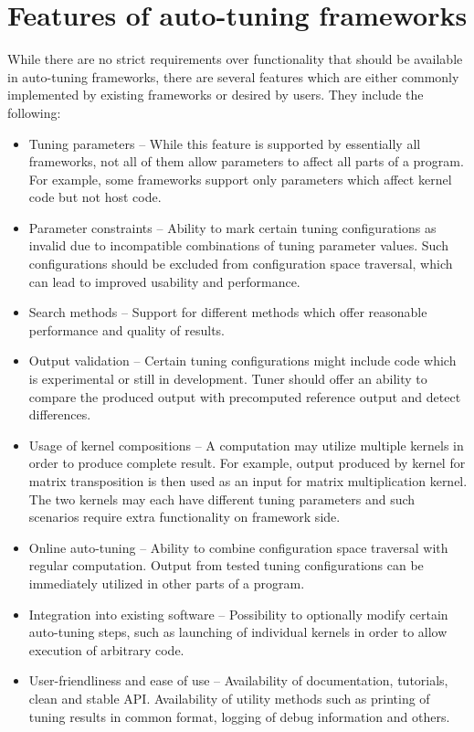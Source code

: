 \documentclass
[
    digital, %
    oneside, %
    table, %
    nolof, %
    nolot, %
    nocover %
]{fithesis3}
\begin{document}
\section{Features of auto-tuning frameworks}
While there are no strict requirements over functionality that should be available in auto-tuning frameworks, there are several features which are either
commonly implemented by existing frameworks or desired by users. They include the following: 
\begin{itemize}
    \item Tuning parameters -- While this feature is supported by essentially all frameworks, not all of them allow parameters to affect
    all parts of a program. For example, some frameworks support only parameters which affect kernel code but not host code.
    \item Parameter constraints -- Ability to mark certain tuning configurations as invalid due to incompatible combinations of tuning parameter values.
    Such configurations should be excluded from configuration space traversal, which can lead to improved usability and performance.
    \item Search methods -- Support for different methods which offer reasonable performance and quality of results.
    \item Output validation -- Certain tuning configurations might include code which is experimental or still in development. Tuner should offer
    an ability to compare the produced output with precomputed reference output and detect differences.
    \item Usage of kernel compositions -- A computation may utilize multiple kernels in order to produce complete result. For example, output produced
    by kernel for matrix transposition is then used as an input for matrix multiplication kernel. The two kernels may each have different tuning
    parameters and such scenarios require extra functionality on framework side.
    \item Online auto-tuning -- Ability to combine configuration space traversal with regular computation. Output from tested tuning configurations can
    be immediately utilized in other parts of a program.
    \item Integration into existing software -- Possibility to optionally modify certain auto-tuning steps, such as launching of individual kernels in
    order to allow execution of arbitrary code.
    \item User-friendliness and ease of use -- Availability of documentation, tutorials, clean and stable API. Availability of utility methods such
    as printing of tuning results in common format, logging of debug information and others.
\end{itemize}
\end{document}
